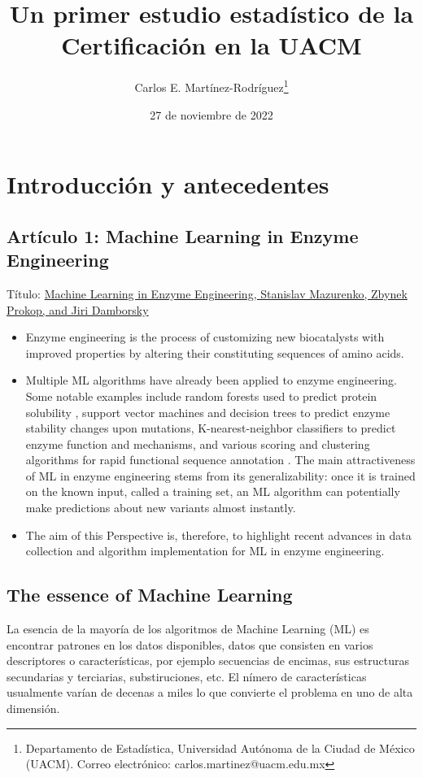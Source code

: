 \documentclass[12pt]{article}
\title{Un primer estudio estad\'istico de la Certificaci\'on en la UACM}
\author{Carlos E. Martínez-Rodríguez\thanks{Departamento de Estadística, Universidad Autónoma de la Ciudad de México (UACM). Correo electrónico: carlos.martinez@uacm.edu.mx}}
\date{27 de noviembre de 2022}
\begin{document}
\maketitle
\tableofcontents

\section{Introducci\'on y antecedentes}


\subsection{Artículo 1: Machine Learning in Enzyme Engineering}
Título: \href{https://pubs.acs.org/doi/full/10.1021/acscatal.9b04321}{Machine Learning in Enzyme Engineering, Stanislav Mazurenko, Zbynek Prokop, and Jiri Damborsky} \cite{Mazurenko}

\begin{itemize}
\item Enzyme engineering is the process of customizing new biocatalysts with improved properties by altering their constituting sequences of amino acids.

\item Multiple ML algorithms have already been applied to enzyme engineering. Some notable examples include random forests used to predict protein solubility \cite{15}, support vector machines \cite{16,17} and decision trees \cite{18} to predict enzyme stability changes upon mutations, K-nearest-neighbor classifiers to predict enzyme function\cite{19} and mechanisms,\cite{20} and various scoring and clustering algorithms for rapid functional sequence annotation \cite{21,22}. The main attractiveness of ML in enzyme engineering stems from its generalizability: once it is trained on the known input, called a training set, an ML algorithm can potentially make predictions about new variants almost instantly.

\item The aim of this Perspective is, therefore, to highlight recent advances in data collection and algorithm implementation for ML in enzyme engineering. 

\end{itemize}

\subsection{The essence of Machine Learning}

La esencia de la mayoría de los algoritmos de Machine Learning (ML) es encontrar patrones en los datos disponibles, datos que consisten en varios descriptores o características, por ejemplo secuencias de encimas, sus estructuras secundarias y terciarias, substiruciones, etc.  El nímero de características usualmente varían de decenas a miles lo que convierte el problema en uno de alta dimensión. 
\end{document}
